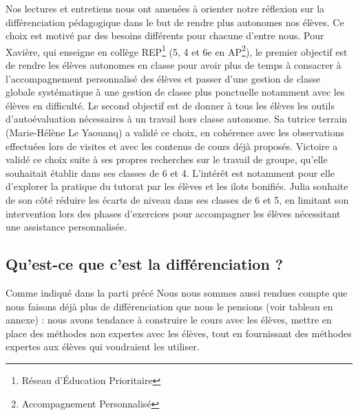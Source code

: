 Nos lectures et entretiens nous ont amenées à orienter notre réflexion sur la différenciation pédagogique dans le but de rendre plus autonomes nos élèves. Ce choix est motivé par des besoins différents pour chacune d’entre nous. Pour Xavière, qui enseigne en collège REP\footnote{Réseau d'Éducation Prioritaire} (5, 4 et 6{e} en AP\footnote{Accompagnement Personnalisé}),  le premier objectif est de rendre les élèves autonomes en classe pour avoir plus de temps à consacrer à l’accompagnement personnalisé des élèves et passer d’une gestion de classe globale systématique à une gestion de classe plus ponctuelle notamment avec les élèves en difficulté. Le second objectif est de donner à tous les élèves les outils d’autoévaluation nécessaires à un travail hors classe autonome. Sa tutrice terrain (Marie-Hélène Le Yaouanq) a validé ce choix, en cohérence avec les observations effectuées lors de visites et avec les contenus de cours déjà proposés. Victoire a validé ce choix suite à ses propres recherches sur le travail de groupe, qu’elle souhaitait établir dans ses classes de 6 et 4. L’intérêt est notamment pour elle d’explorer la pratique du tutorat par les élèves et les ilots bonifiés. Julia souhaite de son côté réduire les écarts de niveau dans ses classes de 6 et 5, en limitant son intervention lors des phases d’exercices pour accompagner les élèves nécessitant une assistance personnalisée.

\subsection{Qu'est-ce que c'est la différenciation ?}
Comme indiqué dans la parti précé
Nous nous sommes aussi rendues compte que nous faisons déjà plus de différenciation que nous le pensions (voir tableau en annexe) : nous avons tendance à construire le cours avec les élèves, mettre en place des méthodes non expertes avec les élèves, tout en fournissant des méthodes expertes aux élèves qui voudraient les utiliser.


